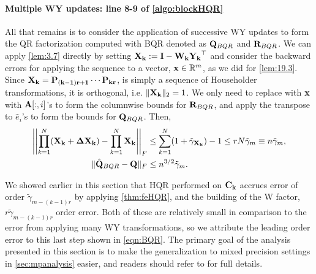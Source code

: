 \paragraph{Multiple WY updates: line 8-9 of \cref{algo:blockHQR}}
All that remains is to consider the application of successive WY updates to form the QR factorization computed with BQR denoted as $\mathbf{Q}_{BQR}$ and $\mathbf{R}_{BQR}$. 
We can apply \cref{lem:3.7} directly by setting $\mathbf{X_k}:= \mathbf{I}-\mathbf{W_k}\mathbf{Y_k}^{\top}$ and consider the backward errors for applying the sequence to a vector, $\mathbf{x}\in\mathbb{R}^{m}$, as we did for \cref{lem:19.3}. 
Since $\mathbf{X_k}=\mathbf{P_{(k-1)r+1}}\cdots\mathbf{P_{kr}}$, is simply a sequence of Householder transformations, it is orthogonal, i.e. $\|\mathbf{X_k}\|_2=1$.
We only need to replace with $\mathbf{x}$ with $\mathbf{A}[:,i]$'s to form the columnwise bounds for $\mathbf{R}_{BQR}$, and apply the transpose to $\hat{e}_i$'s to form the bounds for $\mathbf{Q}_{BQR}$. 
Then, 
\begin{align}
\left|\left|\prod_{k=1}^N (\bb{X_k} + \bb{\Delta X_k})- \prod_{k=1}^N\bb{X_k} \right|\right|_F &\leq\sum_{k=1}^N (1+\tilde{\gamma}_{\bb{X_k}})  -1 \leq rN\tilde{\gamma}_m \equiv n\tilde{\gamma}_m ,\label{eqn:BQR-mp}\\
\|\hat{\bb{Q}}_{BQR}-\bb{Q}\|_F&\leq n^{3/2}\tilde{\gamma}_m. \label{eqn:BQR}
\end{align}

We showed earlier in this section that HQR performed on $\mathbf{C_k}$ accrues error of order $\tilde{\gamma}_{m-(k-1)r}$ by applying \cref{thm:feHQR}, and the building of the W factor, $r\tilde{\gamma}_{m-(k-1)r}$ order error.
Both of these are relatively small in comparison to the error from applying many WY transformations, so we attribute the leading order error to this last step shown in \cref{eqn:BQR}.
The primary goal of the analysis presented in this section is to make the generalization to mixed precision settings in \cref{sec:mpanalysis} easier, and readers should refer to \cite{golub2013matrix,Higham2002} for full details.